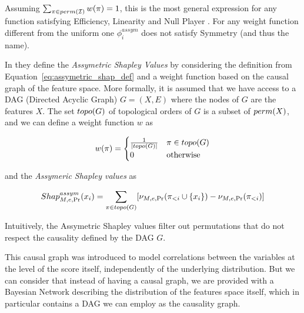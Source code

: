 Assuming $\sum_{\pi \in perm(\mathcal{I})} w(\pi) = 1$, this is the most general expression for any function satisfying Efficiency, Linearity and Null Player \cite{frye2019asymmetric}. For any weight function different from the uniform one $\phi_i^{assym}$ does not satisfy Symmetry (and thus the name).

In \cite{frye2019asymmetric} they define the \textit{Assymetric Shapley Values} by considering the definition from Equation~\ref{eq:assymetric_shap_def}
and a weight function based on the causal graph of the feature space. More formally, it is assumed that we have access to a DAG (Directed Acyclic Graph) $G = (X, E)$ where the nodes of $G$ are the features $X$. The set $topo(G)$ of topological orders of $G$ is a subset of $perm(X)$, and we can define a weight function $w$ as

\begin{align*}
    w(\pi) = \begin{cases}
        \frac{1}{|topo(G)|} & \pi \in topo(G) \\
        0 & \text{otherwise}
    \end{cases}    
\end{align*}


and the \textit{Assymeric Shapley values} as

\begin{align*}
    Shap^{assym}_{M,e,\Pr}(x_i) = \sum_{\pi \in topo(G)} [\nu_{M,e,\Pr}(\pi_{<i} \cup \{x_i\}) - \nu_{M,e,\Pr}(\pi_{<i})] 
\end{align*}

Intuitively, the Assymetric Shapley values filter out permutations that do not respect the causality defined by the DAG $G$.

This causal graph was introduced to model correlations between the variables at the level of the score itself, independently of the underlying distribution. But we can consider that instead of having a causal graph, we are provided with a Bayesian Network describing the distribution of the features space itself, which in particular contains a DAG we can employ as the causality graph.

